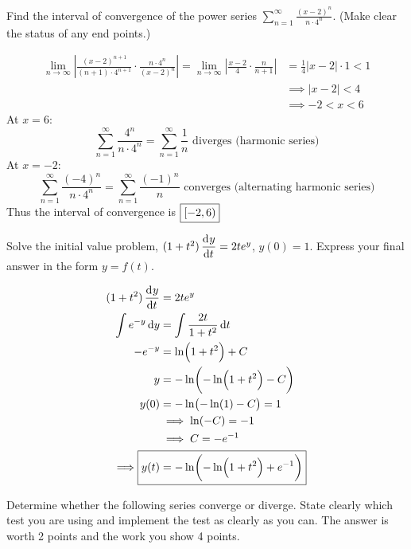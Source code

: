 \documentclass[12pt,answers]{exam}
\begin{document}
\begin{questions}
\newpage
\question[12]
Find the interval of convergence of the power series $\displaystyle \sum_{n=1}^\infty \frac{(x-2)^n}{n \cdot 4^n}$.
(Make clear the status of any end points.)
\begin{solution}
    \begin{align*}
    \lim_{n\to\infty} \left| \frac{(x-2)^{n+1}}{(n+1) \cdot 4^{n+1}} \cdot \frac{n\cdot 4^n}{(x-2)^n}\right|
    = \lim_{n\to\infty} \left| \frac{x-2}{4} \cdot \frac{n}{n+1} \right|
    &= \frac14 |x-2| \cdot 1 < 1 \\ 
    &\implies |x-2| < 4 \\
    &\implies -2 < x < 6
    \end{align*}
    At $x = 6$:
    \[
        \sum_{n=1}^\infty \frac{4^n}{n \cdot 4^n} 
        = \sum_{n=1}^\infty \frac{1}{n} \text{ diverges (harmonic series)}
    \]
    At $x = -2$:
    \[
        \sum_{n=1}^\infty \frac{(-4)^n}{n \cdot 4^n} = \sum_{n=1}^\infty \frac{(-1)^n}{n} \text{ converges (alternating harmonic series)}
    \]
    Thus the interval of convergence is $\boxed{\intco{-2, 6}}$
\end{solution}

\question[12]
Solve the initial value problem, $(1+t^2) \dod{y}{t} = 2t e^y$, $y(0) = 1$. 
Express your final answer in the form $y = f(t)$.
\begin{solution}
    \begin{align*}
        (1+t^2) \dod{y}{t} &= 2t e^y \\ 
        \int e^{-y} \dif y &= \int \frac{2t}{1+t^2} \dif t \\ 
        -e^{-y} &= \ln(1+t^2) + C \\ 
        y &= -\ln(-\ln(1+t^2) - C) \\ 
        y(0) &= -\ln(-\ln(1) - C) = 1 \\ 
        &\implies \ln(-C) = -1 \\ 
        &\implies C = -e^{-1} \\ 
        \implies \Aboxed{y(t) &= -\ln(-\ln(1+t^2) + e^{-1})}
    \end{align*}
\end{solution}

\question
Determine whether the following series converge or diverge.
State clearly which test you are using and implement the test as clearly as you can.
The answer is worth 2 points and the work you show 4 points.
\begin{parts}

\end{parts}
\end{questions}
\end{document}
